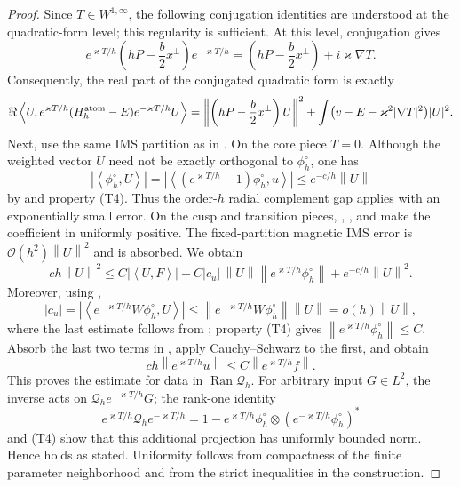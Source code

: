 \documentclass[11pt]{article}
\newcommand{\cQ}{\mathcal Q}
\newcommand{\cO}{\mathcal O}
\newcommand{\abs}[1]{\left|#1\right|}
\newcommand{\norm}[1]{\left\|#1\right\|}
\newcommand{\ip}[2]{\left\langle #1,#2\right\rangle}
\newcommand{\Ran}{\operatorname{Ran}}
\begin{document}
\begin{proof}
Since $T\in W^{1,\infty}$, the following conjugation identities are understood at the quadratic-form level; this regularity is sufficient. At this level, conjugation gives
\[
 e^{\varkappa T/h}\left(hP-\frac b2x^\perp\right)e^{-\varkappa T/h}
 =\left(hP-\frac b2x^\perp\right)+i\varkappa\nabla T.
\]
Consequently, the real part of the conjugated quadratic form is exactly
\begin{equation}\label{eq:weighted-form-identity}
 \Re\ip{U}{e^{\varkappa T/h}(H_h^{\rm atom}-E)e^{-\varkappa T/h}U}
 =\norm{\left(hP-\frac b2x^\perp\right)U}^2
 +\int\bigl(v-E-\varkappa^2|\nabla T|^2\bigr)|U|^2.
\end{equation}
Next, use the same IMS partition as in .  On the core piece $T=0$.  Although the weighted vector $U$ need not be exactly orthogonal to $\phi_h^\circ$, one has
\[
 \abs{\ip{\phi_h^\circ}{U}}
 =\abs{\ip{(e^{\varkappa T/h}-1)\phi_h^\circ}{u}}
 \le e^{-c/h}\norm{U}
\]
by  and property (T4).  Thus the order-$h$ radial complement gap applies with an exponentially small error.  On the cusp and transition pieces, , , and  make the coefficient in  uniformly positive.  The fixed-partition magnetic IMS error is $\cO(h^2)\norm{U}^2$ and is absorbed.  We obtain
\begin{equation}\label{eq:weighted-coercive-form}
 ch\norm{U}^2
 \le C\abs{\ip{U}{F}}
 +C|c_u|\,\norm{U}\norm{e^{\varkappa T/h}\phi_h^\circ}
 +e^{-c/h}\norm{U}^2.
\end{equation}
Moreover, using ,
\[
 |c_u|
 =\abs{\ip{e^{-\varkappa T/h}W\phi_h^\circ}{U}}
 \le \norm{e^{-\varkappa T/h}W\phi_h^\circ}\norm{U}
 =o(h)\norm{U},
\]
where the last estimate follows from ; property (T4) gives $\norm{e^{\varkappa T/h}\phi_h^\circ}\le C$.  Absorb the last two terms in , apply Cauchy--Schwarz to the first, and obtain
\[
 ch\norm{e^{\varkappa T/h}u}
 \le C\norm{e^{\varkappa T/h}f}.
\]
This proves the estimate for data in $\Ran\cQ_h$.  For arbitrary input $G\in L^2$, the inverse acts on $\cQ_he^{-\varkappa T/h}G$; the rank-one identity
\[
 e^{\varkappa T/h}\cQ_he^{-\varkappa T/h}
 =1-e^{\varkappa T/h}\phi_h^\circ\otimes
   (e^{-\varkappa T/h}\phi_h^\circ)^*
\]
and (T4) show that this additional projection has uniformly bounded norm.  Hence  holds as stated.  Uniformity follows from compactness of the finite parameter neighborhood and from the strict inequalities in the construction.


\end{proof}
\end{document}
